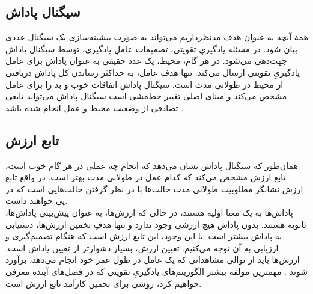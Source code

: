 \subsection{سیگنال پاداش}
همهٔ آنچه به عنوان هدف مدنظرداریم می‌تواند به صورت بیشینه‌سازی  یک سیگنال عددی بیان شود. در مسئله یادگیریِ تقویتی، تصمیمات عاملِ یادگیری، توسط سیگنال پاداش جهت‌دهی می‌شود. در هر گام، محیط، یک عدد حقیقی به عنوان پاداش برای عامل یادگیریِ تقویتی ارسال می‌کند. تنها هدف عامل، به حداکثر رساندن کل پاداش دریافتی از محیط در طولانی مدت است. سیگنال پاداش اتفاقات خوب و بد را برای عامل مشخص می‌کند و مبنای اصلی تغییر خط‌مشی است
سیگنال پاداش می‌تواند تابعی تصادفی از وضعیت محیط و عمل انجام شده باشد
\cite{suttonbook}.
\subsection{تابع ارزش}
همان‌طور که سیگنال پاداش نشان می‌دهد که انجام چه عملی در هر گام خوب است، تابع ارزش مشخص می‌کند که کدام عمل در طولانی مدت بهتر است. در واقع تابع ارزش نشانگر مطلوبیت طولانی مدت حالت‌ها با در نظر گرفتن حالت‌هایی است که در پی خواهند داشت.
\\پاداش‌ها به یک معنا اولیه هستند، در حالی که ارزش‌ها، به عنوان پیش‌بینی پاداش‌ها، ثانویه هستند. بدون پاداش هیچ ارزشی وجود ندارد و تنها هدفِ تخمین ارزش‌ها، دستیابی به پاداش بیشتر است. با این وجود، این تابع ارزش است که هنگام تصمیم‌گیری و ارزیابی به آن توجه می‌کنیم.
تعیین ارزش،‌ بسیار دشوارتر از تعیین پاداش است.
ارزش‌ها باید از توالی مشاهداتی که یک عامل در طول عمر خود انجام می‌دهد، برآورد شوند
\cite{suttonbook}.
مهمترین مولفه بیشتر الگوریتم‌های یادگیریِ تقویتی که در  فصل‌های آینده معرفی خواهیم کرد، روشی برای تخمین کارآمد تابع ارزش است.
